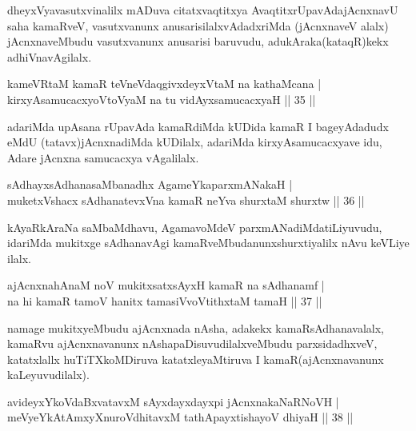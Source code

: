\begin{artha}
dheyxVyavasutxvinalilx mADuva citatxvaqtitxya AvaqtitxrUpavAda\break jAcnxnavU saha kamaRveV, vasutxvanunx anusarisilalxvAdadxriMda (jAcnxnaveV alalx) jAcnxnaveMbudu vasutxvanunx anusarisi baruvudu, adu\break kAraka(kataqR)kekx adhiVnavAgilalx.
\end{artha}

\begin{shl}
kameVRtaM kamaR teVneVdaqgivxdeyxVtaM na kathaMcana |\\
kirxyAsamucacxyoV\s toV\s yaM na tu vidAyxsamucacxyaH \hfill || 35 ||
\end{shl}

\begin{artha}
adariMda upAsana rUpavAda kamaRdiMda kUDida kamaR I bageyAdadudx eMdU (tatavx)jAcnxnadiMda kUDilalx, adariMda kirxyAsamucacxyave idu, Adare jAcnxna samucacxya vAgalilalx.
\end{artha}


\begin{shl}
sAdhayxsAdhanasaMbanadhx AgameYkaparxmANakaH |\\
muketxVshacx sAdhanatevxVna kamaR neYva shurxtaM shurxtw \hfill || 36 ||
\end{shl}

\begin{artha}
kAyaRkAraNa saMbaMdhavu, AgamavoMdeV parxmANadiMda\break tiLiyuvudu, idariMda mukitxge sAdhanavAgi kamaRveMbudanunx\break shurxtiyalilx nAvu keVLiye ilalx.
\end{artha}


\begin{shl}
ajAcnxnahAnaM noV mukitxsatxsAyxH kamaR na sAdhanamf |\\
na hi kamaR tamoV hanitx tamasiVvoVtithxtaM tamaH \hfill || 37 ||
\end{shl}

\begin{artha}
namage mukitxyeMbudu ajAcnxnada nAsha, adakekx kamaRsAdhanavalalx, kamaRvu ajAcnxnavanunx nAshapaDisuvudilalxveMbudu parxsidadhxveV, katatxlallx huTiTXkoMDiruva katatxleyaMtiruva I kamaR(ajAcnxnavanunx kaLeyuvudilalx).
\end{artha}


\begin{shl}
avideyxYkoVdaBxvatavxM sAyxdayxdayxpi jAcnxnakaNaRNoVH |\\
meVyeYkAtAmxyXnuroVdhitavxM tathA\s payxtishayoV dhiyaH \hfill || 38 ||
\end{shl}

